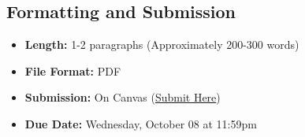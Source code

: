 \documentclass[11pt]{article}
\begin{document}
\subsection*{Formatting and Submission}

\begin{itemize}
    \item[\faFileO] \textbf{Length:} 1-2 paragraphs (Approximately 200-300 words)
    \item[\faFileO] \textbf{File Format:} PDF
    \item[\faFileO] \textbf{Submission:} On Canvas (\href{https://canvas.uoregon.edu/courses/274682/assignments/1916912}{Submit Here})
    \item[\faFileO] \textbf{Due Date:} Wednesday, October 08 at 11:59pm
\end{itemize}
\end{document}
